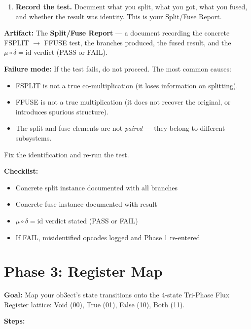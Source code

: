 \documentclass[12pt,a4paper]{article}
\begin{document}
\begin{enumerate}[label=\textbf{2.\arabic*.}, leftmargin=2em]
\item \textbf{Record the test.} Document what you split, what you got, what you fused,
    and whether the result was identity. This is your Split/Fuse Report.
\end{enumerate}

{\bf Artifact:} The \textbf{Split/Fuse Report} — a document recording the
concrete FSPLIT $\to$ FFUSE test, the branches produced, the fused result, and
the $\mu \circ \delta = \mathrm{id}$ verdict (PASS or FAIL).

{\bf Failure mode:} If the test fails, do not proceed. The most common causes:
\begin{itemize}
\item FSPLIT is not a true co-multiplication (it loses information on splitting).
\item FFUSE is not a true multiplication (it does not recover the original, or
    introduces spurious structure).
\item The split and fuse elements are not \emph{paired} — they belong to different
    subsystems.
\end{itemize}
Fix the identification and re-run the test.

{\bf Checklist:}
\begin{itemize}
\item[ ] Concrete split instance documented with all branches
\item[ ] Concrete fuse instance documented with result
\item[ ] $\mu \circ \delta = \mathrm{id}$ verdict stated (PASS or FAIL)
\item[ ] If FAIL, misidentified opcodes logged and Phase 1 re-entered
\end{itemize}

\section{Phase 3: Register Map}

{\bf Goal:} Map your ob3ect's state transitions onto the 4-state Tri-Phase Flux
Register lattice: Void (00), True (01), False (10), Both (11).

{\bf Steps:}
\end{document}
